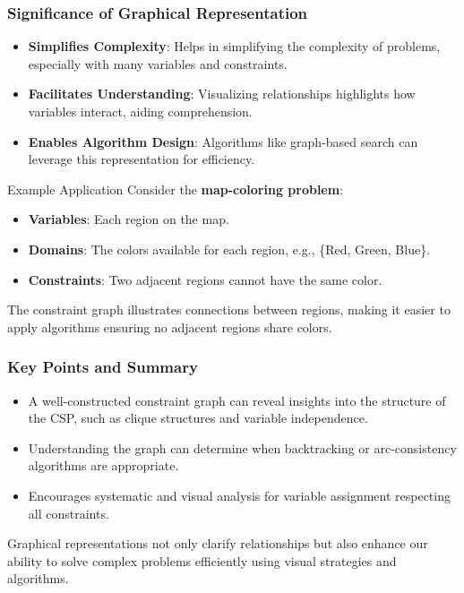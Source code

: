 \documentclass[aspectratio=169]{beamer}
\begin{document}
\begin{frame}[fragile]
    \frametitle{Significance of Graphical Representation}
    \begin{itemize}
        \item \textbf{Simplifies Complexity}: Helps in simplifying the complexity of problems, especially with many variables and constraints.
        \item \textbf{Facilitates Understanding}: Visualizing relationships highlights how variables interact, aiding comprehension.
        \item \textbf{Enables Algorithm Design}: Algorithms like graph-based search can leverage this representation for efficiency.
    \end{itemize}
    \begin{block}{Example Application}
        Consider the \textbf{map-coloring problem}:
        \begin{itemize}
            \item \textbf{Variables}: Each region on the map.
            \item \textbf{Domains}: The colors available for each region, e.g., \{Red, Green, Blue\}.
            \item \textbf{Constraints}: Two adjacent regions cannot have the same color.
        \end{itemize}
        The constraint graph illustrates connections between regions, making it easier to apply algorithms ensuring no adjacent regions share colors.
    \end{block}
\end{frame}

\begin{frame}[fragile]
    \frametitle{Key Points and Summary}
    \begin{itemize}
        \item A well-constructed constraint graph can reveal insights into the structure of the CSP, such as clique structures and variable independence.
        \item Understanding the graph can determine when backtracking or arc-consistency algorithms are appropriate.
        \item Encourages systematic and visual analysis for variable assignment respecting all constraints.
    \end{itemize}
    Graphical representations not only clarify relationships but also enhance our ability to solve complex problems efficiently using visual strategies and algorithms.
\end{frame}
\end{document}
